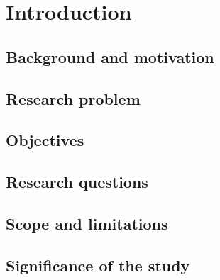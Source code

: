 \chapter{Introduction}
    \section{Background and motivation}
    \section{Research problem}
    \section{Objectives}
    \section{Research questions}
    \section{Scope and limitations}
    \section{Significance of the study}
\cleardoublepage